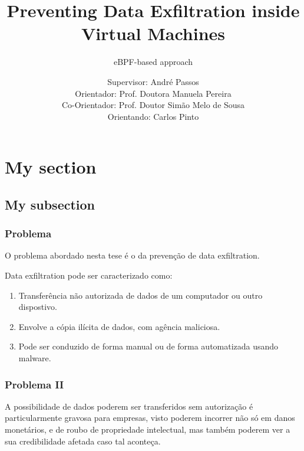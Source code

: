 \documentclass[pdflatex,compress]{beamer}
\title{Preventing Data Exfiltration inside Virtual Machines}
\subtitle{eBPF-based approach}
\author{Supervisor: André Passos\\
Orientador: Prof. Doutora Manuela Pereira\\
Co-Orientador: Prof. Doutor Simão Melo de Sousa\\
\bigskip\bigskip 
Orientando: Carlos Pinto}
\begin{document}
\maketitle

\section{My section}
\subsection{My subsection}

\begin{frame}
\frametitle{Problema}

O problema abordado nesta tese é o da prevenção de data exfiltration. 
\pause \bigskip

Data exfiltration pode ser caracterizado como: 
\begin{enumerate}
    \pause
    \item Transferência não autorizada de dados de um computador ou outro dispostivo. 
        \pause 
    \item Envolve a cópia ilícita de dados, com agência maliciosa. 
        \pause
    \item Pode ser conduzido de forma manual ou de forma automatizada usando malware. 
\end{enumerate}

\end{frame}

\begin{frame}
\frametitle{Problema II}

A possibilidade de dados poderem ser transferidos sem autorização é particularmente gravosa para empresas, visto poderem incorrer não só em danos monetários, e de roubo de propriedade intelectual, mas também poderem ver a sua credibilidade afetada caso tal aconteça. 

\end{frame}
\end{document}
